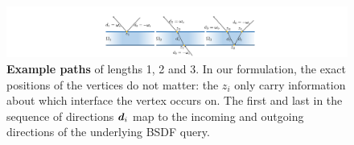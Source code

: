 \begin{figure}
	\centering
	\includegraphics[width=\columnwidth]{img/illustration/omega.pdf}
	\caption{\label{fig:singlelayer}
		\textbf{Example paths} of lengths 1, 2 and 3.
		In our formulation, the exact positions of the vertices do not matter: the $z_i$ only carry information about which interface the vertex occurs on.
		The first and last in the sequence of directions $\bm{d}_i$ map to the incoming and outgoing directions of the underlying BSDF query.
	}
\end{figure}